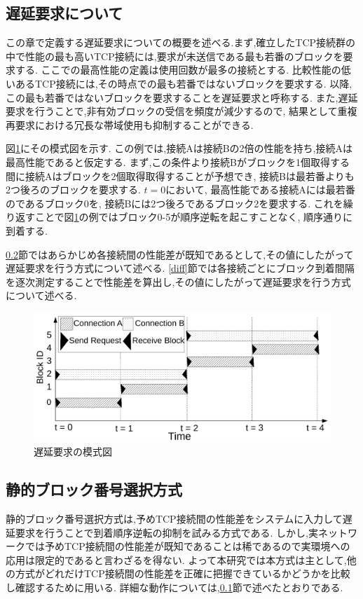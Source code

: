 \documentclass[a4j,12pt]{gradthesis_utf8}
\begin{document}
\newpage

\subsection{遅延要求について}
\label{chienyokyu}
この章で定義する遅延要求についての概要を述べる.まず,確立したTCP接続群の中で性能の最も高いTCP接続には,要求が未送信である最も若番のブロックを要求する.
ここでの最高性能の定義は使用回数が最多の接続とする.
比較性能の低いあるTCP接続には,その時点での最も若番ではないブロックを要求する.
以降,この最も若番ではないブロックを要求することを遅延要求と呼称する.
また,遅延要求を行うことで,非有効ブロックの受信を頻度が減少するので,
結果として重複再要求における冗長な帯域使用も抑制することができる.

図\ref{delay}にその模式図を示す.
この例では,接続Aは接続Bの2倍の性能を持ち,接続Aは最高性能であると仮定する.
まず,この条件より接続Bがブロックを1個取得する間に接続Aはブロックを2個取得取得することが予想でき,
接続Bは最若番よりも2つ後ろのブロックを要求する.
\begin{math}t=0\end{math}において,
最高性能である接続Aには最若番のであるブロック0を,
接続Bには2つ後ろであるブロック2を要求する.
これを繰り返すことで図\ref{delay}の例ではブロック0-5が順序逆転を起こすことなく,
順序通りに到着する.

\ref{kotei}節ではあらかじめ各接続間の性能差が既知であるとして,その値にしたがって遅延要求を行う方式について述べる.
\ref{diff}節では各接続ごとにブロック到着間隔を逐次測定することで性能差を算出し,その値にしたがって遅延要求を行う方式について述べる.

\begin{figure}[ht]
    \centering
    \includegraphics[width=16.25cm]{figure/delay-n.pdf}
    \caption{遅延要求の模式図}
    \label{delay}
\end{figure}

\subsection{静的ブロック番号選択方式}
\label{kotei}
静的ブロック番号選択方式は,予めTCP接続間の性能差をシステムに入力して遅延要求を行うことで到着順序逆転の抑制を試みる方式である.
しかし,実ネットワークでは予めTCP接続間の性能差が既知であることは稀であるので実環境への応用は限定的であると言わざるを得ない.
よって本研究では本方式は主として,他の方式がどれだけTCP接続間の性能差を正確に把握できているかどうかを比較し確認するために用いる.
詳細な動作については,\ref{chienyokyu}節で述べたとおりである.
\end{document}
